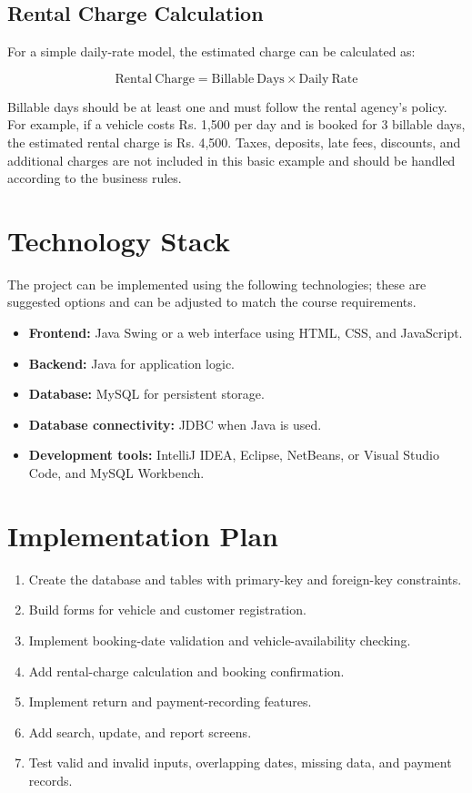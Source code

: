 \documentclass[11pt,a4paper]{report}
\begin{document}
\subsection{Rental Charge Calculation}
For a simple daily-rate model, the estimated charge can be calculated as:

\[
\mathrm{Rental\ Charge} = \mathrm{Billable\ Days} \times \mathrm{Daily\ Rate}
\]

Billable days should be at least one and must follow the rental agency's policy. For example, if a vehicle costs Rs. 1,500 per day and is booked for 3 billable days, the estimated rental charge is Rs. 4,500. Taxes, deposits, late fees, discounts, and additional charges are not included in this basic example and should be handled according to the business rules.

\section{Technology Stack}
The project can be implemented using the following technologies; these are suggested options and can be adjusted to match the course requirements.
\begin{itemize}
\item \textbf{Frontend:} Java Swing or a web interface using HTML, CSS, and JavaScript.
\item \textbf{Backend:} Java for application logic.
\item \textbf{Database:} MySQL for persistent storage.
\item \textbf{Database connectivity:} JDBC when Java is used.
\item \textbf{Development tools:} IntelliJ IDEA, Eclipse, NetBeans, or Visual Studio Code, and MySQL Workbench.
\end{itemize}

\section{Implementation Plan}
\begin{enumerate}
\item Create the database and tables with primary-key and foreign-key constraints.
\item Build forms for vehicle and customer registration.
\item Implement booking-date validation and vehicle-availability checking.
\item Add rental-charge calculation and booking confirmation.
\item Implement return and payment-recording features.
\item Add search, update, and report screens.
\item Test valid and invalid inputs, overlapping dates, missing data, and payment records.
\end{enumerate}
\end{document}
